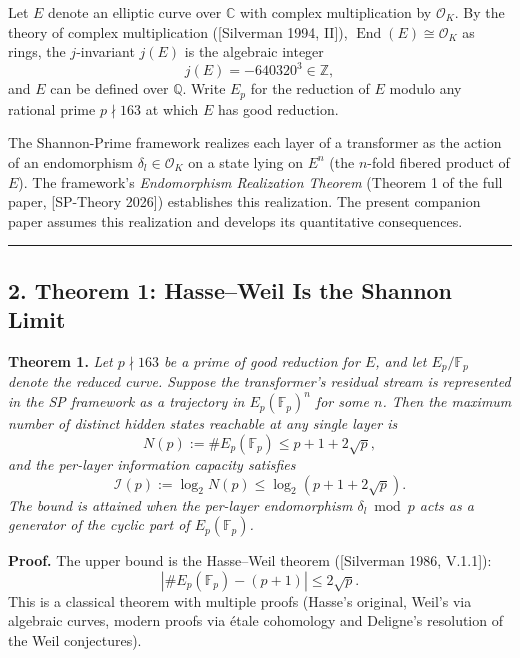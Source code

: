 \documentclass[
  11pt,
]{article}
\begin{document}
Let \(E\) denote an elliptic curve over \(\mathbb{C}\) with complex
multiplication by \(\mathcal{O}_K\). By the theory of complex
multiplication ({[}Silverman 1994, II{]}),
\(\operatorname{End}(E) \cong \mathcal{O}_K\) as rings, the
\(j\)-invariant \(j(E)\) is the algebraic integer
\[j(E) = -640320^3 \in \mathbb{Z},\] and \(E\) can be defined over
\(\mathbb{Q}\). Write \(E_p\) for the reduction of \(E\) modulo any
rational prime \(p \nmid 163\) at which \(E\) has good reduction.

The Shannon-Prime framework realizes each layer of a transformer as the
action of an endomorphism \(\delta_l \in \mathcal{O}_K\) on a state
lying on \(E^n\) (the \(n\)-fold fibered product of \(E\)). The
framework's \emph{Endomorphism Realization Theorem} (Theorem 1 of the
full paper, {[}SP-Theory 2026{]}) establishes this realization. The
present companion paper assumes this realization and develops its
quantitative consequences.

\begin{center}\rule{0.5\linewidth}{0.5pt}\end{center}

\hypertarget{theorem-1-hasseweil-is-the-shannon-limit}{%
\subsection{2. Theorem 1: Hasse--Weil Is the Shannon
Limit}\label{theorem-1-hasseweil-is-the-shannon-limit}}

\textbf{Theorem 1.} \emph{Let \(p \nmid 163\) be a prime of good
reduction for \(E\), and let \(E_p / \mathbb{F}_p\) denote the reduced
curve. Suppose the transformer's residual stream is represented in the
SP framework as a trajectory in \(E_p(\mathbb{F}_p)^n\) for some \(n\).
Then the maximum number of distinct hidden states reachable at any
single layer is} \[N(p) := \#E_p(\mathbb{F}_p) \leq p + 1 + 2\sqrt{p},\]
\emph{and the per-layer information capacity satisfies}
\[\mathcal{I}(p) := \log_2 N(p) \leq \log_2(p + 1 + 2\sqrt{p}).\]
\emph{The bound is attained when the per-layer endomorphism
\(\delta_l \bmod p\) acts as a generator of the cyclic part of
\(E_p(\mathbb{F}_p)\).}

\textbf{Proof.} The upper bound is the Hasse--Weil theorem ({[}Silverman
1986, V.1.1{]}): \[|\#E_p(\mathbb{F}_p) - (p+1)| \leq 2\sqrt{p}.\] This
is a classical theorem with multiple proofs (Hasse's original, Weil's
via algebraic curves, modern proofs via étale cohomology and Deligne's
resolution of the Weil conjectures).
\end{document}
